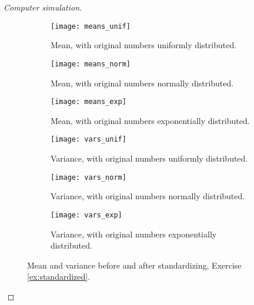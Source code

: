 \documentclass[letterpaper, 10 pt, conference]{article}
\begin{document}
\begin{proof}[Computer simulation]
	\begin{figure}
		\centering
		\begin{subfigure}{0.3\linewidth}
			\texttt{[image: means\_unif]}
			\caption{Mean, with original numbers uniformly distributed.}
			\label{fig:means_unif}
		\end{subfigure}
		\hfill
		\begin{subfigure}{0.3\linewidth}
			\texttt{[image: means\_norm]}
			\caption{Mean, with original numbers normally distributed.}
			\label{fig:means_norm}
		\end{subfigure}
		\hfill
		\begin{subfigure}{0.3\linewidth}
			\texttt{[image: means\_exp]}
			\caption{Mean, with original numbers exponentially distributed.}
			\label{fig:means_exp}
		\end{subfigure}
		\hfill
		\begin{subfigure}{0.3\linewidth}
			\texttt{[image: vars\_unif]}
			\caption{Variance, with original numbers uniformly distributed.}
			\label{fig:vars_unif}
		\end{subfigure}
		\hfill
		\begin{subfigure}{0.3\linewidth}
			\texttt{[image: vars\_norm]}
			\caption{Variance, with original numbers normally distributed.}
			\label{fig:vars_norm}
		\end{subfigure}
		\hfill
		\begin{subfigure}{0.3\linewidth}
			\texttt{[image: vars\_exp]}
			\caption{Variance, with original numbers exponentially distributed.}
			\label{fig:vars_exp}
		\end{subfigure}
		\caption{Mean and variance  before and after standardizing, Exercise \ref{ex:standardized}.} 
		\label{fig:standardized}
	\end{figure}
\end{proof}
\end{document}
